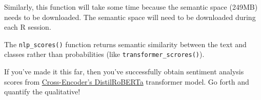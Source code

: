\documentclass[
]{article}
\begin{document}
Similarly, this function will take some time because the semantic space
(249MB) needs to be downloaded. The semantic space will need to be
downloaded during each R session.

The \texttt{nlp\_scores()} function returns semantic similarity between
the text and classes rather than probabilities (like
\texttt{transformer\_scrores()}).

If you've made it this far, then you've successfully obtain sentiment
analysis scores from
\href{https://huggingface.co/cross-encoder/nli-distilroberta-base}{Cross-Encoder's DistilRoBERTa}
transformer model. Go forth and quantify the qualitative!
\end{document}

